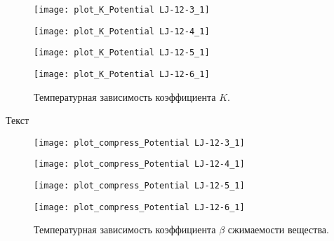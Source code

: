 \begin{figure}[htbp!]
\begin{center}
\begin{minipage}[h]{0.45\linewidth}
\texttt{[image: plot\_K\_Potential LJ-12-3\_1]}
\end{minipage}
\begin{minipage}[h]{0.45\linewidth}
\texttt{[image: plot\_K\_Potential LJ-12-4\_1]}
\end{minipage}


\begin{minipage}[h]{0.45\linewidth}
\texttt{[image: plot\_K\_Potential LJ-12-5\_1]}
\end{minipage}
\begin{minipage}[h]{0.45\linewidth}
\texttt{[image: plot\_K\_Potential LJ-12-6\_1]}
\end{minipage}
\caption{Температурная зависимость коэффициента $K$.}
\label{risK}
\end{center}
\end{figure}

Текст


\begin{figure}[htbp!]
\begin{center}
\begin{minipage}[h]{0.45\linewidth}
\texttt{[image: plot\_compress\_Potential LJ-12-3\_1]}
\end{minipage}
\begin{minipage}[h]{0.45\linewidth}
\texttt{[image: plot\_compress\_Potential LJ-12-4\_1]}
\end{minipage}


\begin{minipage}[h]{0.45\linewidth}
\texttt{[image: plot\_compress\_Potential LJ-12-5\_1]}
\end{minipage}
\begin{minipage}[h]{0.45\linewidth}
\texttt{[image: plot\_compress\_Potential LJ-12-6\_1]}
\end{minipage}
\caption{Температурная зависимость коэффициента $\beta$ сжимаемости вещества.}
\label{ris13}
\end{center}
\end{figure}


